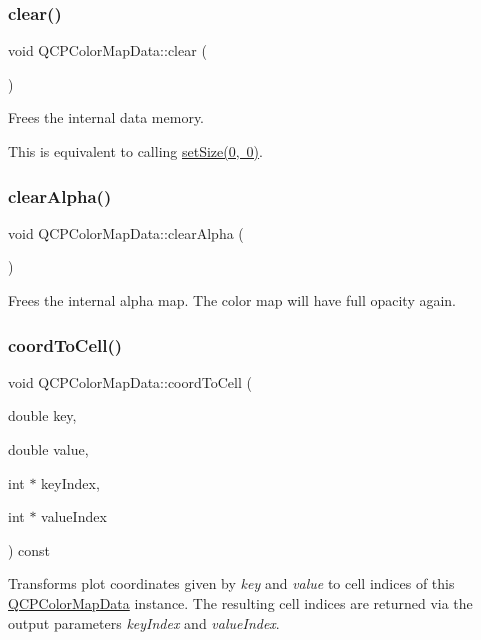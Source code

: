 \subsubsection{\texorpdfstring{clear()}{clear()}}
{\footnotesize\ttfamily void Q\+C\+P\+Color\+Map\+Data\+::clear (\begin{DoxyParamCaption}{ }\end{DoxyParamCaption})}

Frees the internal data memory.

This is equivalent to calling \mbox{\hyperlink{class_q_c_p_color_map_data_a0d9ff35c299d0478b682bfbcdd9c097e}{set\+Size(0, 0)}}. \mbox{\label{class_q_c_p_color_map_data_a14d08b9c3720cd719400079b86d3906b}} 
\subsubsection{\texorpdfstring{clearAlpha()}{clearAlpha()}}
{\footnotesize\ttfamily void Q\+C\+P\+Color\+Map\+Data\+::clear\+Alpha (\begin{DoxyParamCaption}{ }\end{DoxyParamCaption})}

Frees the internal alpha map. The color map will have full opacity again. \mbox{\label{class_q_c_p_color_map_data_aca5b29e0ca2f299c9060fc6e1f74d0c8}} 
\subsubsection{\texorpdfstring{coordToCell()}{coordToCell()}}
{\footnotesize\ttfamily void Q\+C\+P\+Color\+Map\+Data\+::coord\+To\+Cell (\begin{DoxyParamCaption}\item[{double}]{key,  }\item[{double}]{value,  }\item[{int $\ast$}]{key\+Index,  }\item[{int $\ast$}]{value\+Index }\end{DoxyParamCaption}) const}

Transforms plot coordinates given by {\itshape key} and {\itshape value} to cell indices of this \mbox{\hyperlink{class_q_c_p_color_map_data}{Q\+C\+P\+Color\+Map\+Data}} instance. The resulting cell indices are returned via the output parameters {\itshape key\+Index} and {\itshape value\+Index}.

